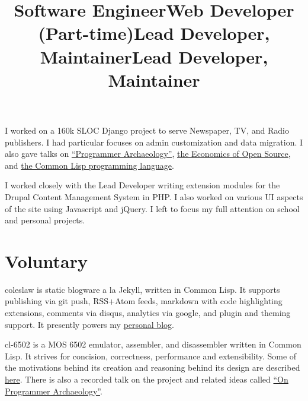 \documentclass[margintitle,line]{res}
\renewcommand{\subsection}[1]{\section{\normalfont #1}}
\begin{document}
\begin{resume}
\title{Software Engineer}
\begin{position}
  I worked on a 160k SLOC Django project to serve Newspaper, TV, and Radio publishers.
  I had particular focuses on admin customization and data migration. I also gave talks
  on \href{http://redlinernotes.com/docs/talks/opa.html}{``Programmer Archaeology''},
  \href{http://redlinernotes.com/docs/talks/wosw.html}{the Economics of Open Source}, and
  \href{http://redlinernotes.com/docs/talks/cl-gbu.html}{the Common Lisp programming language}.
\end{position}

\title{Web Developer (Part-time)}
\begin{position}
  I worked closely with the Lead Developer writing extension modules
  for the Drupal Content Management System in PHP. I also worked on
  various UI aspects of the site using Javascript and jQuery.
  I left to focus my full attention on school and personal projects.
\end{position}


\subsection{Voluntary}


\title{Lead Developer, Maintainer}
\begin{position}
  coleslaw is static blogware a la Jekyll, written in Common Lisp. It supports
  publishing via git push, RSS+Atom feeds, markdown with code highlighting extensions,
  comments via disqus, analytics via google, and plugin and theming support. It presently
  powers my \href{http://blog.redlinernotes.com/}{personal blog}.
\end{position}

\title{Lead Developer, Maintainer}
\begin{position}
  cl-6502 is a MOS 6502 emulator, assembler, and disassembler written in Common Lisp.
  It strives for concision, correctness, performance and extensibility. Some of the
  motivations behind its creation and reasoning behind its design are described
  \href{http://blog.redlinernotes.com/posts/On-Interactive-Retrocomputing.html}{here}.
  There is also a recorded talk on the project and related ideas called
  \href{http://vimeo.com/redline6561/on-programmer-archaeology}{``On Programmer Archaeology''}.
\end{position}


\end{resume}
\end{document}

